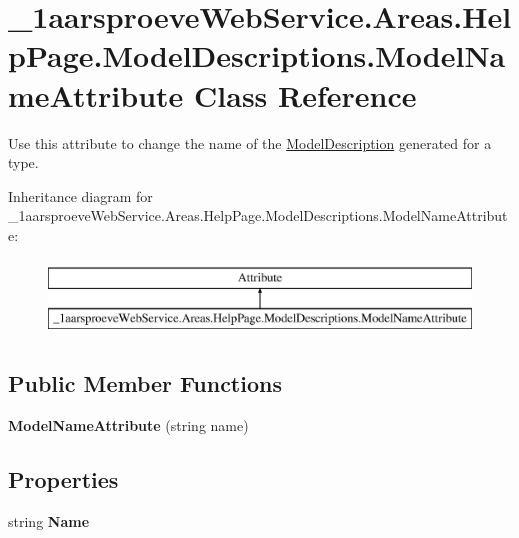 \hypertarget{class__1aarsproeve_web_service_1_1_areas_1_1_help_page_1_1_model_descriptions_1_1_model_name_attribute}{}\section{\+\_\+1aarsproeve\+Web\+Service.\+Areas.\+Help\+Page.\+Model\+Descriptions.\+Model\+Name\+Attribute Class Reference}
\label{class__1aarsproeve_web_service_1_1_areas_1_1_help_page_1_1_model_descriptions_1_1_model_name_attribute}


Use this attribute to change the name of the \hyperlink{class__1aarsproeve_web_service_1_1_areas_1_1_help_page_1_1_model_descriptions_1_1_model_description}{Model\+Description} generated for a type.  


Inheritance diagram for \+\_\+1aarsproeve\+Web\+Service.\+Areas.\+Help\+Page.\+Model\+Descriptions.\+Model\+Name\+Attribute\+:\begin{figure}[H]
\begin{center}
\leavevmode
\includegraphics[height=2.000000cm]{class__1aarsproeve_web_service_1_1_areas_1_1_help_page_1_1_model_descriptions_1_1_model_name_attribute}
\end{center}
\end{figure}
\subsection*{Public Member Functions}
\begin{DoxyCompactItemize}
\item 
\hypertarget{class__1aarsproeve_web_service_1_1_areas_1_1_help_page_1_1_model_descriptions_1_1_model_name_attribute_a3c556da4a2c88b8dd1f01756a0d66295}{}{\bfseries Model\+Name\+Attribute} (string name)\label{class__1aarsproeve_web_service_1_1_areas_1_1_help_page_1_1_model_descriptions_1_1_model_name_attribute_a3c556da4a2c88b8dd1f01756a0d66295}

\end{DoxyCompactItemize}
\subsection*{Properties}
\begin{DoxyCompactItemize}
\item 
\hypertarget{class__1aarsproeve_web_service_1_1_areas_1_1_help_page_1_1_model_descriptions_1_1_model_name_attribute_afe346b943d7fc65f710a10b44173dc57}{}string {\bfseries Name}\label{class__1aarsproeve_web_service_1_1_areas_1_1_help_page_1_1_model_descriptions_1_1_model_name_attribute_afe346b943d7fc65f710a10b44173dc57}

\end{DoxyCompactItemize}



